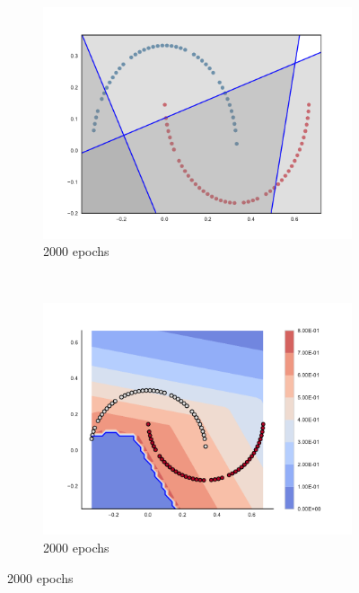 \begin{figure}
    \\
    \begin{subfigure}[b]{0.3\textwidth}
        \includegraphics[width=\textwidth]{img/zero/2000/09-conv2d_1-0.pdf}
        \caption{2000 epochs}
        \label{fig:zerosInput2000}
    \end{subfigure}
    ~ %
    \begin{subfigure}[b]{0.3\textwidth}
        \includegraphics[width=\textwidth]{img/zero/2000/57-09-output.pdf}
        \caption{2000 epochs}
        \label{fig:zerosOutput2000}
    \end{subfigure}

\end{figure}
